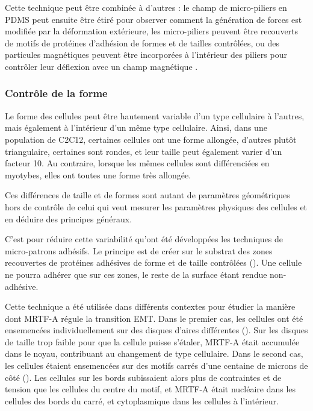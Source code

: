 Cette technique peut être combinée à d'autres : le champ de micro-piliers en PDMS peut ensuite être étiré pour observer comment la génération de forces est modifiée par la déformation extérieure, les micro-piliers peuvent être recouverts de motifs de protéines d'adhésion de formes et de tailles contrôlées, ou des particules magnétiques peuvent être incorporées à l'intérieur des piliers pour contrôler leur déflexion avec un champ magnétique \parencite{gupta_micropillar_2015}. 

\subsubsection{Contrôle de la forme}

Le forme des cellules peut être hautement variable d'un type cellulaire à l'autres, mais également à l'intérieur d'un même type cellulaire. 
Ainsi, dans une population de C2C12, certaines cellules ont une forme allongée, d'autres plutôt triangulaire, certaines sont rondes, et leur taille peut également varier d'un facteur 10. Au contraire, lorsque les mêmes cellules sont différenciées en myotybes, elles ont toutes une forme très allongée. 

Ces différences de taille et de formes sont autant de paramètres géométriques hors de contrôle de celui qui veut mesurer les paramètres physiques des cellules et en déduire des principes généraux. 

C'est pour réduire cette variabilité qu'ont été développées les techniques de micro-patrons adhésifs. 
Le principe est de créer sur le substrat des zones recouvertes de protéines adhésives de forme et de taille contrôlées (\cite{thery_adhesive_2009}).
Une cellule ne pourra adhérer que sur ces zones, le reste de la surface étant rendue non-adhésive. 

Cette technique a été utilisée dans différents contextes pour étudier la manière dont MRTF-A régule la transition EMT. 
Dans le premier cas, les cellules ont été ensemencées individuellement sur des disques d'aires différentes (\cite{connelly_actin_2010}). Sur les disques de taille trop faible pour que la cellule puisse s'étaler, MRTF-A était accumulée dans le noyau, contribuant au changement de type cellulaire. 
Dans le second cas, les cellules étaient ensemencées sur des motifs carrés d'une centaine de microns de côté (\cite{gomez_tissue_2010}). Les cellules sur les bords subissaient alors plus de contraintes et de tension que les cellules du centre du motif, et MRTF-A était nucléaire dans les cellules des bords du carré, et cytoplasmique dans les cellules à l'intérieur.

